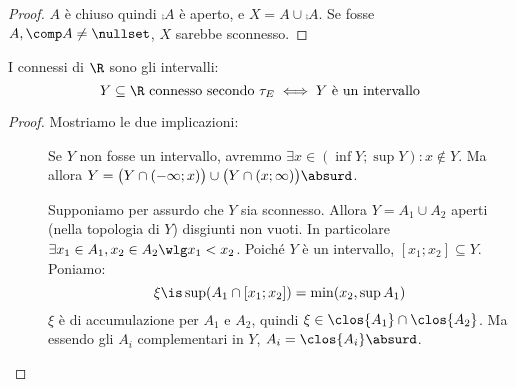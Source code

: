 \begin{proof}
	$A$ è chiuso quindi $\comp A$ è aperto,
	e $X=A\cup\comp A$.
	Se fosse $A,\comp A\neq\nullset$,
	$X$ sarebbe sconnesso.
\end{proof}

\begin{prop}
	I connessi di $\R$ sono gli intervalli:
	\[Y\subseteq\R\text{ connesso secondo }\tau_E\iff
	Y\text{ è un intervallo}\]
\end{prop}

\begin{proof}
	Mostriamo le due implicazioni:
	\begin{description}
		\item[\proofrightarrow]
			Se $Y$ non fosse un intervallo, avremmo
			$\exists x\in(\inf Y;\sup Y):x\not\in Y$.
			Ma allora $Y=\big(Y\cap(-\infty;x)\big)\cup\big(Y\cap(x;\infty)\big)\absurd$.
		\item[\proofleftarrow]
			Supponiamo per assurdo che $Y$ sia sconnesso.
			Allora $Y=A_1\cup A_2$ aperti (nella topologia di $Y$) disgiunti non vuoti.
			In particolare $\exists x_1\in A_1,x_2\in A_2\wlg x_1<x_2$.
			Poiché $Y$ è un intervallo, $[x_1;x_2]\subseteq Y$.
			Poniamo:
			\[\xi\is\sup(A_1\cap[x_1;x_2])=\min(x_2,\sup A_1)\]
			$\xi$ è di accumulazione per $A_1$ e $A_2$, quindi
			$\xi\in\clos{A_1}\cap\clos{A_2}$.
			Ma essendo gli $A_i$ complementari in $Y$, $A_i=\clos{A_i}\absurd$.
			\qedhere
	\end{description}
\end{proof}
